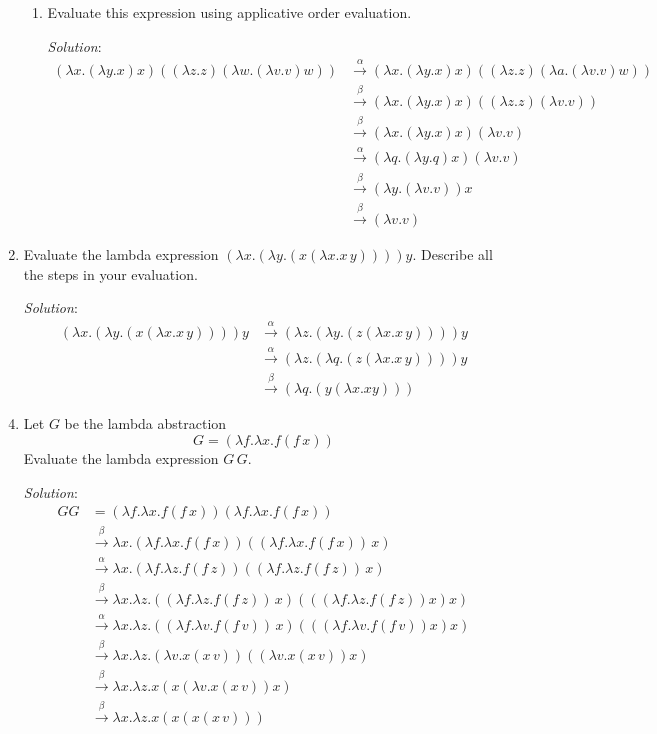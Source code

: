 \documentclass[]{article}
\begin{document}
\begin{enumerate}
\begin{enumerate}
\item Evaluate this expression using applicative order evaluation.
\item[\emph{Solution}:]
\begin{align*}
(\lambda x.(\lambda y.x)x)((\lambda z.z)(\lambda w.(\lambda v.v)w)) &\overset{\alpha}{\rightarrow}(\lambda x.(\lambda y.x)x)((\lambda z.z)(\lambda a.(\lambda v.v)w))\\
&\overset{\beta}{\rightarrow}(\lambda x.(\lambda y.x)x)((\lambda z.z)(\lambda v.v)) \\
&\overset{\beta}{\rightarrow}(\lambda x.(\lambda y.x)x)(\lambda v.v) \\
&\overset{\alpha}{\rightarrow}(\lambda q.(\lambda y.q)x)(\lambda v.v) \\
&\overset{\beta}{\rightarrow}(\lambda y.(\lambda v.v))x \\
&\overset{\beta}{\rightarrow}(\lambda v.v)
\end{align*}
\end{enumerate}


\item Evaluate the lambda expression $(\lambda x.(\lambda y.(x(\lambda x.x\,y))))y$. Describe all the steps in your evaluation.
\item[\emph{Solution}:] 
\begin{align}
(\lambda x.(\lambda y.(x(\lambda x.x\,y))))y &\overset{\alpha}{\rightarrow} (\lambda z.(\lambda y.(z(\lambda x.x\,y))))y \\
&\overset{\alpha}{\rightarrow}(\lambda z.(\lambda q.(z(\lambda x.x\,y))))y \\
&\overset{\beta}{\rightarrow}(\lambda q.(y(\lambda x.x y)))
\end{align}
\item Let $G$ be the lambda abstraction
\[ G = (\lambda f.\lambda x.f(f\,x)) \]
Evaluate the lambda expression $G\,G$.
\item[\emph{Solution}:]
\begin{align*}
GG &= (\lambda f.\lambda x.f(f\,x))(\lambda f.\lambda x.f(f\,x)) \\
&\overset{\beta}{\rightarrow}\lambda x.(\lambda f.\lambda x.f(f\,x))((\lambda f.\lambda x.f(f\,x))\,x) \\
&\overset{\alpha}{\rightarrow}\lambda x.(\lambda f.\lambda z.f(f\,z))((\lambda f.\lambda z.f(f\,z))\,x) \\
&\overset{\beta}{\rightarrow}\lambda x.\lambda z.((\lambda f.\lambda z.f(f\,z))\,x)(((\lambda f.\lambda z.f(f\,z))x)x) \\
&\overset{\alpha}{\rightarrow}\lambda x.\lambda z.((\lambda f.\lambda v.f(f\,v))\,x)(((\lambda f.\lambda v.f(f\,v))x)x) \\
&\overset{\beta}{\rightarrow}\lambda x.\lambda z.(\lambda v.x(x\,v))((\lambda v.x(x\,v))x) \\
&\overset{\beta}{\rightarrow}\lambda x.\lambda z.x(x(\lambda v.x(x\,v))x) \\
&\overset{\beta}{\rightarrow}\lambda x.\lambda z.x(x(x(x\,v)))
\end{align*}


\end{enumerate}
\end{document}

